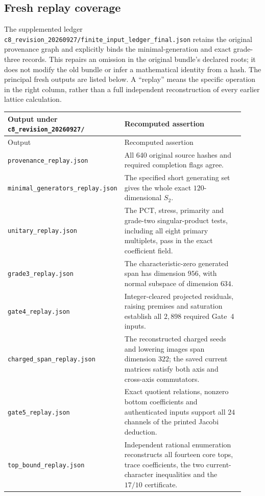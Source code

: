 \documentclass[11pt,a4paper]{article}
\theoremstyle{definition}
\newcommand{\artifact}[1]{\textnormal{\nolinkurl{#1}}}
\begin{document}
\subsection{Fresh replay coverage}
The supplemented ledger
\artifact{c8_revision_20260927/finite_input_ledger_final.json}
retains the original provenance graph and explicitly binds the
minimal-generation and exact grade-three records. This repairs an
omission in the original bundle's declared roots; it does not modify
the old bundle or infer a mathematical identity from a hash.
The principal fresh outputs are listed below. A ``replay'' means the
specific operation in the right column, rather than a full independent
reconstruction of every earlier lattice calculation.

\begin{longtable}{@{}p{0.38\linewidth}p{0.54\linewidth}@{}}
\toprule
Output under \artifact{c8_revision_20260927/} & Recomputed assertion\\
\midrule\endfirsthead
\toprule Output & Recomputed assertion\\\midrule\endhead
\bottomrule\endfoot
\artifact{provenance_replay.json} & All 640 original source hashes and
required completion flags agree.\\
\artifact{minimal_generators_replay.json} & The specified short
generating set gives the whole exact $120$-dimensional $S_2$.\\
\artifact{unitary_replay.json} & The PCT, stress, primarity and
grade-two singular-product tests, including all eight primary
multiplets, pass in the exact coefficient field.\\
\artifact{grade3_replay.json} & The characteristic-zero generated
span has dimension $956$, with normal subspace of dimension $634$.\\
\artifact{gate4_replay.json} & Integer-cleared projected residuals,
raising premises and saturation establish all $2,898$ required
Gate~4 inputs.\\
\artifact{charged_span_replay.json} & The reconstructed charged
seeds and lowering images span dimension $322$; the saved current
matrices satisfy both axis and cross-axis commutators.\\
\artifact{gate5_replay.json} & Exact quotient relations, nonzero
bottom coefficients and authenticated inputs support all $24$
channels of the printed Jacobi deduction.\\
\artifact{top_bound_replay.json} & Independent rational enumeration
reconstructs all fourteen core tops, trace coefficients, the two
current-character inequalities and the $17/10$ certificate.\\

\end{longtable}
\end{document}
